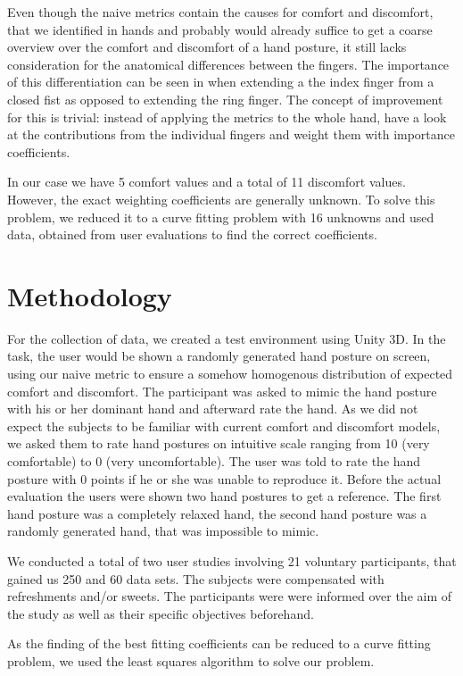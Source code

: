 \documentclass{sig-alternate-05-2015}
\begin{document}
Even though the naive metrics contain the causes for comfort and discomfort, that we identified in hands and probably would already suffice to get a coarse overview over the comfort and discomfort of a hand posture, it still lacks consideration for the anatomical differences between the fingers. The importance of this differentiation can be seen in when extending a the index finger from a closed fist as opposed to extending the ring finger. 
The concept of improvement for this is trivial: instead of applying the metrics to the whole hand, have a look at the contributions from the individual fingers and weight them with importance coefficients. 

In our case we have 5 comfort values and a total of 11 discomfort values. However, the exact weighting coefficients are generally unknown. To solve this problem, we reduced it to a curve fitting problem with 16 unknowns and used data, obtained from user evaluations to find the correct coefficients.

\section{Methodology}

For the collection of data, we created a test environment using Unity 3D. In the task, the user would be shown a randomly generated hand posture on screen, using our naive metric to ensure a somehow homogenous distribution of expected comfort and discomfort. The participant was asked to mimic the hand posture with his or her dominant hand and afterward rate the hand. As we did not expect the subjects to be familiar with current comfort and discomfort models, we asked them to rate hand postures on intuitive scale ranging from 10 (very comfortable) to 0 (very uncomfortable). The user was told to rate the hand posture with 0 points if he or she was unable to reproduce it.
Before the actual evaluation the users were shown two hand postures to get a reference. The first hand posture was a completely relaxed hand, the second hand posture was a randomly generated hand, that was impossible to mimic. 

We conducted a total of two user studies involving 21 voluntary participants, that gained us 250 and 60 data sets. The subjects were compensated with refreshments and/or sweets.
The participants were were informed over the aim of the study as well as their specific objectives beforehand.

As the finding of the best fitting coefficients can be reduced to a curve fitting problem, we used the least squares algorithm to solve our problem.
\end{document}

